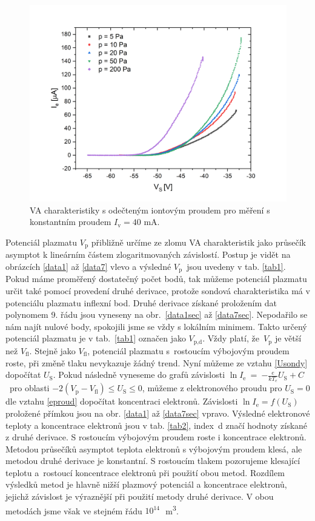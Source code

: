 \documentclass[a4paper,12pt]{article}
\begin{document}
\begin{figure}[h!]
	\centering
	\includegraphics[width=135mm]{odectene34567.png}
	\caption{VA charakteristiky s odečteným iontovým proudem pro měření s konstantním proudem $I_\text{v} = 40$ \si{\milli\ampere}.}
	\label{odectene34567}
\end{figure}

\newpage
Potenciál plazmatu $V_\text{p}$ přibližně určíme ze zlomu VA charakteristik 
jako průsečík asymptot k lineárním částem zlogaritmovaných závislostí. Postup 
je vidět na obrázcích \ref{data1} až \ref{data7} vlevo a výsledné 
$V_\text{p}$~jsou uvedeny v tab. \ref{tab1}. Pokud máme proměřený dostatečný 
počet bodů, tak můžeme potenciál plazmatu určit také pomocí provedení druhé 
derivace, protože sondová charakteristika má v potenciálu plazmatu inflexní 
bod. Druhé derivace získané proložením dat polynomem 9. řádu
jsou vyneseny na obr.~\ref{data1sec} až \ref{data7sec}.
Nepodařilo se nám najít nulové body, spokojili jsme se vždy
s lokálním minimem.
Takto určený potenciál plazmatu je v tab.~\ref{tab1} označen jako 
$V_\text{p,d}$. Vždy platí, že~$V_\text{p}$ je větší než $V_\text{fl}$. Stejně 
jako 
$V_\text{fl}$, potenciál plazmatu s~rostoucím výbojovým proudem roste, při změně
tlaku nevykazuje žádný trend. Nyní můžeme ze vztahu \eqref{Usondy} dopočítat $U_\text{S}$. Pokud následně vyneseme do grafů závislosti $\ln
I_{\text{e}}$~=~$-\frac{e}{kT_e}U_\text{S}+C$~pro oblasti $-2(V_\text{p} - 
V_\text{{fl}}) \leq U_\text{S} \leq 0$, můžeme z
elektronového proudu pro $U_\text{S} = 0$ dle vztahu \eqref{eproud} dopočítat koncentraci elektronů. Závislosti $\ln I_{\text{e}} =
f(U_\text{S})$ proložené přímkou jsou na obr. \ref{data1} až 
\ref{data7sec} vpravo. Výsledné elektronové teploty a koncentrace
elektronů jsou v tab. \ref{tab2}, index~d značí hodnoty získané
z druhé derivace. S rostoucím výbojovým proudem roste i 
koncentrace elektronů. Metodou průsečíků asymptot teplota elektronů s výbojovým 
proudem klesá, ale metodou druhé derivace je konstantní. S rostoucím
tlakem pozorujeme klesající teplotu a~rostoucí koncentrace elektronů při 
použití obou metod. Rozdílem výsledků metod je hlavně nižší plazmový potenciál 
a koncentrace elektronů, jejichž závislost je výraznější při použití metody 
druhé derivace. V obou metodách jsme však ve stejném řádu 
$10^{14}$\,\si{\per\cubic\meter}.
\end{document}
